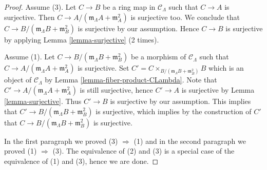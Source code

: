 \documentclass{stacks-project}
\theoremstyle{plain}
\theoremstyle{definition}
\theoremstyle{remark}
\numberwithin{equation}{subsection}
\begin{document}
\begin{proof}
Assume (3). Let $C \to B$ be a ring map in $\mathcal{C}_\Lambda$ such
that $C \to A$ is surjective. Then
$C \to A/(\mathfrak m_\Lambda A + \mathfrak m_A^2)$ is surjective
too. We conclude that $C \to B/(\mathfrak m_\Lambda B + \mathfrak m_B^2)$
is surjective by our assumption. Hence $C \to B$ is surjective by applying
Lemma \ref{lemma-surjective} (2 times).

\medskip\noindent
Assume (1). Let $C \to B/(\mathfrak m_\Lambda B + \mathfrak m_B^2)$
be a morphism of $\mathcal{C}_\Lambda$ such that
$C \to A/(\mathfrak m_\Lambda A + \mathfrak m_A^2)$ is surjective. Set
$C' = C \times_{B/(\mathfrak m_\Lambda B + \mathfrak m_B^2)} B$
which is an object of $\mathcal{C}_\Lambda$ by
Lemma \ref{lemma-fiber-product-CLambda}.
Note that $C' \to A/(\mathfrak m_\Lambda A + \mathfrak m_A^2)$
is still surjective, hence $C' \to A$ is surjective by
Lemma \ref{lemma-surjective}.
Thus $C' \to B$ is surjective by our assumption. This implies
that $C' \to B/(\mathfrak m_\Lambda B + \mathfrak m_B^2)$ is
surjective, which implies by the construction of $C'$ that
$C \to B/(\mathfrak m_\Lambda B + \mathfrak m_B^2)$ is surjective.

\medskip\noindent
In the first paragraph we proved (3) $\Rightarrow$ (1) and in the second
paragraph we proved (1) $\Rightarrow$ (3). The equivalence of
(2) and (3) is a special case of the equivalence of (1) and (3), hence
we are done.
\end{proof}
\end{document}
